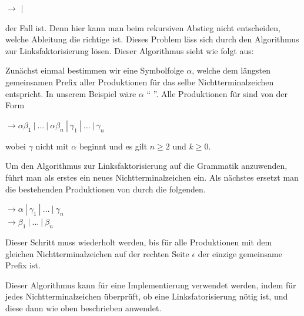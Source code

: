 \noindent
{}$ \to$   
   $|$ 
   
\vspace{10pt}

\noindent der Fall ist. Denn hier kann man beim rekursiven Abstieg nicht
entscheiden, welche Ableitung die richtige ist. Dieses Problem läss sich durch
den Algorithmus zur Linksfaktorisierung lösen. Dieser Algorithmus sieht wie folgt
aus:\vspace{10pt}

Zunächst einmal bestimmen wir eine Symbolfolge $\alpha$, welche dem längsten
gemeinsamen Prefix aller Produktionen für das selbe Nichtterminalzeichen
 entspricht. In unserem Beispiel wäre $\alpha$ 
"`  
"'. Alle Produktionen für  sind von der
Form\vspace{10pt}

\noindent
{}$ \to \alpha \beta_1\ |\ \ldots\ |\ \alpha
\beta_n\ |\ \gamma_1\ |\ \ldots\ |\ \gamma_n$
\vspace{10pt}

\noindent
wobei $\gamma$ nicht mit $\alpha$ beginnt und es gilt $n \geq 2$ und $k \geq 0$.
\vspace{10pt}

Um den Algorithmus zur Linksfaktorisierung auf die Grammatik anzuwenden, führt
man als erstes ein neues Nichtterminalzeichen  ein. Als
nächstes ersetzt man die bestehenden Produktionen von 
durch die folgenden.\vspace{10pt}

\noindent
{}$ \to \alpha $$\ |\ \gamma_1\ |\ \ldots\ |\ \gamma_n$\\
$ \to \beta_1\ |\ \ldots\ |\ \beta_n$
\vspace{10pt}

\noindent
Dieser Schritt muss wiederholt werden, bis für alle Produktionen mit dem
glei\-chen Nichtterminalzeichen auf der rechten Seite $\epsilon$ der einzige
gemeinsame Prefix ist.\vspace{10pt}

Dieser Algorithmus kann für eine Implementierung verwendet werden, indem für
jedes Nichtterminalzeichen überprüft, ob eine Linksfatorisierung nötig ist, und
diese dann wie oben beschrieben anwendet.



